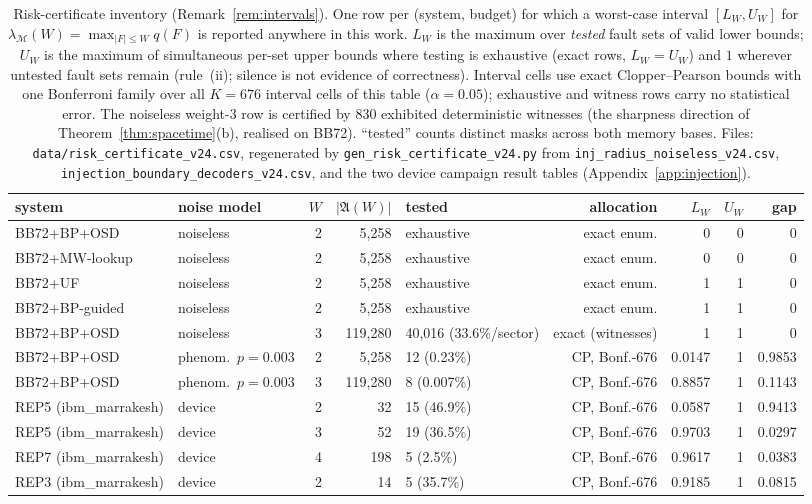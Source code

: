 \documentclass[11pt,a4paper]{article}
\begin{document}
\begin{table}[H]\centering\footnotesize
\caption{Risk-certificate inventory (Remark~\ref{rem:intervals}). One row
per (system, budget) for which a worst-case interval $[L_W,U_W]$ for
$\lambda_{\mathcal{M}}(W)=\max_{|F|\le W}q(F)$ is reported anywhere in
this work. $L_W$ is the maximum over \emph{tested} fault sets of valid
lower bounds; $U_W$ is the maximum of simultaneous per-set upper bounds
where testing is exhaustive (exact rows, $L_W=U_W$) and $1$ wherever
untested fault sets remain (rule~(ii); silence is not evidence of
correctness). Interval cells use exact Clopper--Pearson bounds with one
Bonferroni family over all $K=676$ interval cells of this table
($\alpha=0.05$); exhaustive and witness rows carry no statistical error.
The noiseless weight-3 row is certified by $830$ exhibited deterministic
witnesses (the sharpness direction of Theorem~\ref{thm:spacetime}(b),
realised on BB72). ``tested'' counts distinct masks across both
memory bases. Files: \texttt{data/risk\_certificate\_v24.csv},
regenerated by \texttt{gen\_risk\_certificate\_v24.py} from
\texttt{inj\_radius\_noiseless\_v24.csv},
\texttt{injection\_boundary\_decoders\_v24.csv}, and the two device
campaign result tables (Appendix~\ref{app:injection}).}
\label{tab:riskcert}
\setlength{\tabcolsep}{3pt}\scriptsize
\begin{tabular}{@{}llrrlrrrr@{}}
\toprule
system & noise model & $W$ & $|\mathfrak{A}(W)|$ & tested & allocation
 & $L_W$ & $U_W$ & gap \\\midrule
BB72+BP+OSD & noiseless & 2 & 5{,}258 & exhaustive & exact enum. & 0 & 0 & 0 \\
BB72+MW-lookup & noiseless & 2 & 5{,}258 & exhaustive & exact enum. & 0 & 0 & 0 \\
BB72+UF & noiseless & 2 & 5{,}258 & exhaustive & exact enum. & 1 & 1 & 0 \\
BB72+BP-guided & noiseless & 2 & 5{,}258 & exhaustive & exact enum. & 1 & 1 & 0 \\
BB72+BP+OSD & noiseless & 3 & 119{,}280 & 40{,}016 (33.6\%/sector) & exact (witnesses) & 1 & 1 & 0 \\
BB72+BP+OSD & phenom.\ $p{=}0.003$ & 2 & 5{,}258 & 12 (0.23\%) & CP, Bonf.-676 & 0.0147 & 1 & 0.9853 \\
BB72+BP+OSD & phenom.\ $p{=}0.003$ & 3 & 119{,}280 & 8 (0.007\%) & CP, Bonf.-676 & 0.8857 & 1 & 0.1143 \\
REP5 (ibm\_marrakesh) & device & 2 & 32 & 15 (46.9\%) & CP, Bonf.-676 & 0.0587 & 1 & 0.9413 \\
REP5 (ibm\_marrakesh) & device & 3 & 52 & 19 (36.5\%) & CP, Bonf.-676 & 0.9703 & 1 & 0.0297 \\
REP7 (ibm\_marrakesh) & device & 4 & 198 & 5 (2.5\%) & CP, Bonf.-676 & 0.9617 & 1 & 0.0383 \\
REP3 (ibm\_marrakesh) & device & 2 & 14 & 5 (35.7\%) & CP, Bonf.-676 & 0.9185 & 1 & 0.0815 \\
\bottomrule
\end{tabular}
\end{table}
\end{document}
